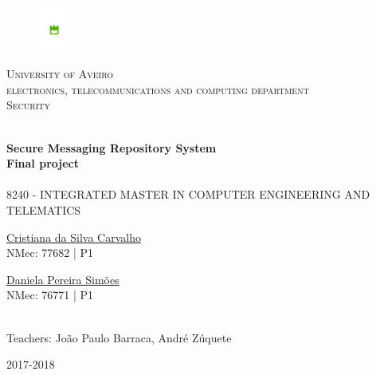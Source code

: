 \begin{figure}[h]
\center
\includegraphics[height=1.5cm]{imagens/logo}
\end{figure}

\begin{center}

\textsc{\large University of Aveiro \\[1cm]\large electronics, telecommunications and computing department}\\[1cm]

\textsc{\large Security \\[1cm]}

\HRule \\[0.5cm]
{ \huge \bfseries Secure Messaging Repository System}\\[0.4cm]
{ \large \bfseries Final project}\\[0.4cm]
\HRule \\[1cm]

\textsc{\small{8240 - INTEGRATED MASTER IN COMPUTER ENGINEERING AND TELEMATICS}}\\[1cm]

\end{center}

\begin{minipage}{0.4\textwidth}

\begin{flushleft} \large
\href{mailto:cristiana.carvalho@ua.pt}{Cristiana da Silva Carvalho }
 \small{\\NMec: 77682 | P1}
\end{flushleft}
\end{minipage}
\begin{minipage}{0.4\textwidth}

\begin{flushright} \large
\href{mailto:danielasimoes@ua.pt}{Daniela Pereira Simões}
\small{\\NMec: 76771 | P1}
\end{flushright}
\end{minipage}\\[1cm]

{\large Teachers: João Paulo Barraca, André Zúquete   }\\[0.5cm]

\vfill

{\large 2017-2018}

